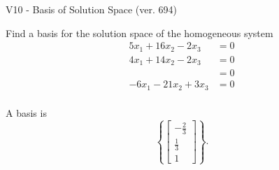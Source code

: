\begin{exercise}
  \begin{exerciseTitle}V10 - Basis of Solution Space (ver. 694)\end{exerciseTitle}
  \begin{exerciseStatement}
    Find a basis for the solution space of the homogeneous system 
\begin{align*}
 5 x_ 1 + 16 x_ 2 -2 x_ 3 &= 0  \\ 
  4 x_ 1 + 14 x_ 2 -2 x_ 3 &= 0  \\ 
  &= 0  \\ 
  -6 x_ 1 -21 x_ 2 + 3 x_ 3 &= 0  \\ 
 \end{align*}


 
  \end{exerciseStatement}

  \begin{exerciseAnswer}
   A basis is   
\[\left\{\left[\begin{array}{c}
-\frac{2}{3} \\
\frac{1}{3} \\
1
\end{array}\right]\right\}.\]

  


  \end{exerciseAnswer}
\end{exercise}